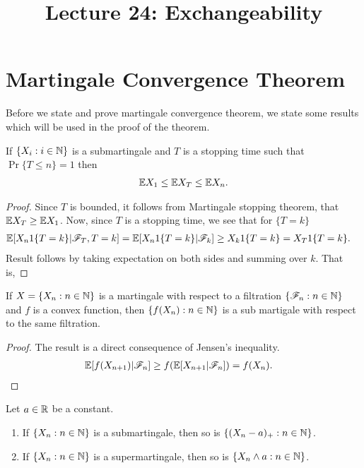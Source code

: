 \documentclass[a4paper,10pt,english]{article}
\title{Lecture 24: Exchangeability}
\author{}
\begin{document}
\maketitle

\section{Martingale Convergence Theorem}
Before we state and prove martingale convergence theorem, we state some results which will be used in the proof of the theorem.
\begin{lem}
\label{StoppingTimeBound}
If $\{X_i:  i \in \mathbb{N} \}$ is  a submartingale and $T$ is a stopping time such that $\Pr\{T \leq n\}=1$ then
\begin{align*}
 \mathbb{E} X_1 \leq \mathbb{E} X_T \leq \mathbb{E} X_n.
\end{align*}
\end{lem}
\begin{proof}
Since $T$ is bounded, it follows from Martingale stopping theorem, that $\mathbb{E} X_T  \geq \mathbb{E} X_1$. 
Now, since $T$ is a stopping time, we see that for $\{T = k\}$
\begin{align*}
\E[X_n1\{T = k\}|\F_T,T=k]&= %
\E[X_n1\{T = k\}|\F_k] \geq X_k1\{T = k \} = X_T1\{T = k\}.
\end{align*}
Result follows by taking expectation on both sides and summing over $k$. 
That is,
\end{proof}

\begin{lem}
\label{ConvexFuncSubmart}
If $X = \{X_n: n \in \mathbb{N}\}$ is a martingale with respect to a filtration $\{\mathscr{F}_n: n \in \mathbb{N}\}$ and $f$ is a convex function, 
then $\{f(X_n): n \in \mathbb{N}\}$ is a sub martigale with respect to the same filtration.
\end{lem}
\begin{proof}
The result is a direct consequence of Jensen's inequality.
\begin{align*}
\mathbb{E}[f(X_{n+1})|\mathscr{F}_n] &\geq f(\mathbb{E}[X_{n+1}|\mathscr{F}_n])=f(X_n).
\end{align*}
\end{proof}

\begin{cor} 
Let $a \in \mathbb{R}$ be a constant. 
\begin{enumerate}[i\_]
\item If $\{X_n : n \in \mathbb{N}\}$ is a submartingale, then so is $\{(X_n - a)_+: n \in \mathbb{N}\}$.  
\item If $\{X_n : n \in \mathbb{N}\}$ is a supermartingale, then so is $\{X_n \wedge a: n \in \mathbb{N}\}$. 
\end{enumerate}
\end{cor}
\end{document}
